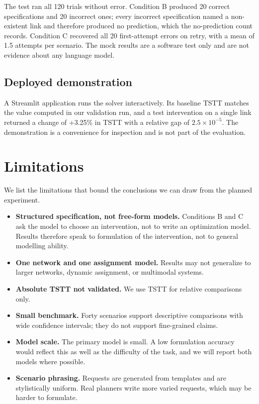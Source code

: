 \documentclass[11pt,a4paper]{article}
\begin{document}
The test ran all 120 trials without error. Condition B produced 20 correct specifications and 20 incorrect ones; every incorrect specification named a non-existent link and therefore produced no prediction, which the no-prediction count records. Condition C recovered all 20 first-attempt errors on retry, with a mean of 1.5 attempts per scenario. The mock results are a software test only and are not evidence about any language model.

\subsection{Deployed demonstration}
A Streamlit application runs the solver interactively. Its baseline TSTT matches the value computed in our validation run, and a test intervention on a single link returned a change of +3.25\% in TSTT with a relative gap of $2.5\times10^{-5}$. The demonstration is a convenience for inspection and is not part of the evaluation.

\section{Limitations}
We list the limitations that bound the conclusions we can draw from the planned experiment.
\begin{itemize}[leftmargin=1.5em]
\item \textbf{Structured specification, not free-form models.} Conditions B and C ask the model to choose an intervention, not to write an optimization model. Results therefore speak to formulation of the intervention, not to general modelling ability.
\item \textbf{One network and one assignment model.} Results may not generalize to larger networks, dynamic assignment, or multimodal systems.
\item \textbf{Absolute TSTT not validated.} We use TSTT for relative comparisons only.
\item \textbf{Small benchmark.} Forty scenarios support descriptive comparisons with wide confidence intervals; they do not support fine-grained claims.
\item \textbf{Model scale.} The primary model is small. A low formulation accuracy would reflect this as well as the difficulty of the task, and we will report both models where possible.
\item \textbf{Scenario phrasing.} Requests are generated from templates and are stylistically uniform. Real planners write more varied requests, which may be harder to formulate.
\end{itemize}
\end{document}
